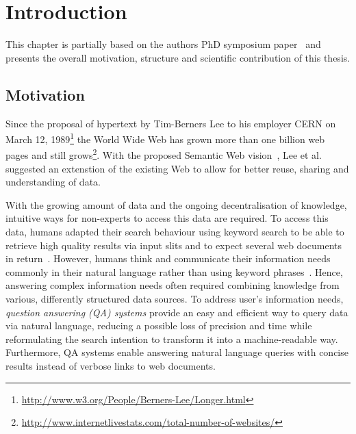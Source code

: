 \chapter{Introduction}
This chapter is partially based on the authors PhD symposium paper~\cite{combiningLDandIR} and presents the overall motivation, structure and scientific contribution of this thesis.
\section{Motivation}
Since the proposal of hypertext by Tim-Berners Lee to his employer CERN on March 12, 1989\footnote{\url{http://www.w3.org/People/Berners-Lee/Longer.html}} the World Wide Web has grown more than one billion web pages and still grows\footnote{\url{http://www.internetlivestats.com/total-number-of-websites/}}.
With the proposed Semantic Web vision~\cite{bernerslee2001semantic}, Lee et al. suggested an extenstion of the existing Web to allow for better reuse, sharing and understanding of data. %

With the growing amount of data and the ongoing decentralisation of knowledge, intuitive ways for non-experts to access this data are required. 
To access this data, humans adapted their search behaviour using keyword search to be able to retrieve high quality results via input slits and to expect several web documents in return~\cite{ilprints361}.
However, humans think and communicate their information needs commonly in their natural language rather than using keyword phrases~\cite{woods1973progress}. 
Hence, answering complex information needs often required combining knowledge from various, differently structured data sources.
To address user's information needs, \emph{question answering (QA) systems} provide an easy and efficient way to query data via natural language, reducing a possible loss of precision and time while reformulating the search intention to transform it into a machine-readable way.
Furthermore, QA systems enable answering natural language queries with concise results instead of verbose links to web documents. 


